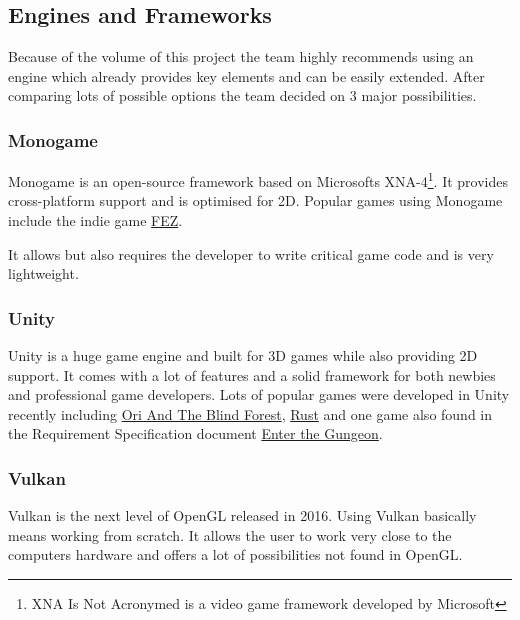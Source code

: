 \documentclass[11pt]{article}
\begin{document}
\newpage

\subsection{Engines and Frameworks}
Because of the volume of this project the team highly recommends using an engine which already provides key elements and can be easily extended.
After comparing lots of possible options the team decided on 3 major possibilities.

\subsubsection{Monogame}\label{subsubsec:monogame}
Monogame is an open-source framework based on Microsofts XNA-4\footnote{XNA Is Not Acronymed is a video game framework developed by Microsoft}. It provides cross-platform support and is optimised for 2D.
Popular games using Monogame include the indie game \href{http://store.steampowered.com/app/224760/}{FEZ}.

It allows but also requires the developer to write critical game code and is very lightweight.
\subsubsection{Unity}\label{subsubsec:unity}
Unity is a huge game engine and built for 3D games while also providing 2D support. It comes with a lot of features and a solid framework for both newbies and professional game developers.
Lots of popular games were developed in Unity recently including \href{http://www.oriblindforest.com}{Ori And The Blind Forest}, \href{https://playrust.com}{Rust} and one game also found in the Requirement Specification document \href{http://dodgeroll.com/gungeon/}{Enter the Gungeon}.
\subsubsection{Vulkan}\label{subsubsec:vulkan}
Vulkan is the next level of OpenGL released in 2016. Using Vulkan basically means working from scratch. It allows the user to work very close to the computers hardware and offers a lot of possibilities not found in OpenGL.
\newpage
\end{document}
